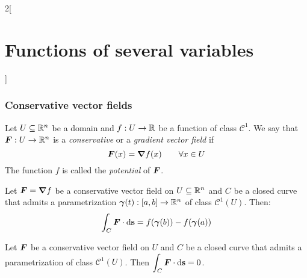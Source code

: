 \documentclass[../../../main.tex]{subfiles}
\begin{document}
\begin{multicols}{2}[\section{Functions of several variables}]
  \subsubsection*{Conservative vector fields}
  \begin{definition}
    Let $U\subseteq\mathbb{R}^n$ be a domain and $f:U\rightarrow\mathbb{R} $ be a function of class $\mathcal{C}^1$. We say that $\boldsymbol{F}:U\rightarrow\mathbb{R}^n$ is a \textit{conservative} or a \textit{gradient vector field} if $$\boldsymbol{F}(x)=\grad f(x)\qquad \forall x\in U$$ The function $f$ is called the \textit{potential} of $\boldsymbol{F}$.
  \end{definition}
  \begin{theorem}
    Let $\boldsymbol{F}=\grad f$ be a conservative vector field on $U\subseteq\mathbb{R}^n$ and $C$ be a closed curve that admits a parametrization $\boldsymbol{\gamma}(t):[a,b]\rightarrow\mathbb{R}^n$ of class $\mathcal{C}^1(U)$. Then: $$\int_C\boldsymbol{F}\cdot \dd \vb{s}=f(\boldsymbol{\gamma}(b))-f(\boldsymbol{\gamma}(a))$$
  \end{theorem}
  \begin{corollary}
    Let $\boldsymbol{F}$ be a conservative vector field on $U$ and $C$ be a closed curve that admits a parametrization of class $\mathcal{C}^1(U)$. Then $\displaystyle\int_C\boldsymbol{F}\cdot \dd \vb{s}=0$.
  \end{corollary}

\end{multicols}
\end{document}
